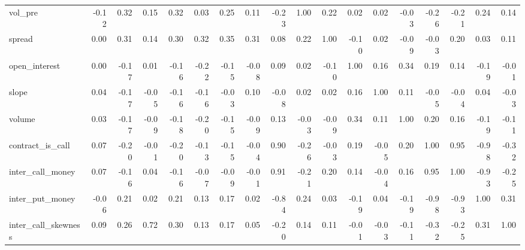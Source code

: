 \begin{tabular}{lrrrrrrrrrrrrrrrrr}
vol\_pre             &    -0.12 &        0.32 &      0.15 &    0.32 &          0.03 &        0.25 &  0.11 &    -0.23 &     1.00 &    0.22 &           0.02 &   0.02 &   -0.03 &             -0.26 &             -0.21 &             0.24 &                 0.14 \\
spread              &     0.00 &        0.31 &      0.14 &    0.30 &          0.32 &        0.35 &  0.31 &     0.08 &     0.22 &    1.00 &          -0.10 &   0.02 &   -0.09 &             -0.03 &              0.20 &             0.03 &                 0.11 \\
open\_interest       &     0.00 &       -0.17 &      0.01 &   -0.16 &         -0.22 &       -0.15 & -0.08 &     0.09 &     0.02 &   -0.10 &           1.00 &   0.16 &    0.34 &              0.19 &              0.14 &            -0.19 &                -0.01 \\
slope               &     0.04 &       -0.17 &     -0.05 &   -0.16 &         -0.16 &       -0.03 &  0.10 &    -0.08 &     0.02 &    0.02 &           0.16 &   1.00 &    0.11 &             -0.05 &             -0.04 &             0.04 &                -0.03 \\
volume              &     0.03 &       -0.17 &     -0.09 &   -0.18 &         -0.20 &       -0.15 & -0.09 &     0.13 &    -0.03 &   -0.09 &           0.34 &   0.11 &    1.00 &              0.20 &              0.16 &            -0.19 &                -0.11 \\
contract\_is\_call    &     0.07 &       -0.20 &     -0.01 &   -0.20 &         -0.13 &       -0.15 & -0.04 &     0.90 &    -0.26 &   -0.03 &           0.19 &  -0.05 &    0.20 &              1.00 &              0.95 &            -0.98 &                -0.32 \\
inter\_call\_money    &     0.07 &       -0.16 &      0.04 &   -0.16 &         -0.07 &       -0.09 & -0.01 &     0.91 &    -0.21 &    0.20 &           0.14 &  -0.04 &    0.16 &              0.95 &              1.00 &            -0.93 &                -0.25 \\
inter\_put\_money     &    -0.06 &        0.21 &      0.02 &    0.21 &          0.13 &        0.17 &  0.02 &    -0.84 &     0.24 &    0.03 &          -0.19 &   0.04 &   -0.19 &             -0.98 &             -0.93 &             1.00 &                 0.31 \\
inter\_call\_skewness &     0.09 &        0.26 &      0.72 &    0.30 &          0.13 &        0.17 &  0.05 &    -0.20 &     0.14 &    0.11 &          -0.01 &  -0.03 &   -0.11 &             -0.32 &             -0.25 &             0.31 &                 1.00 \\
\bottomrule
\end{tabular}

